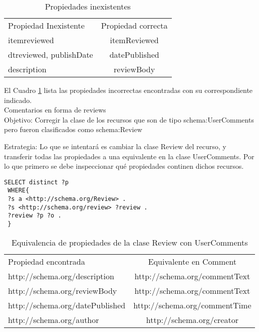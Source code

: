 \begin{table}[h]
\begin{tabular}{| l | c |}
 Propiedad Inexistente & Propiedad correcta \\
 itemreviewed & itemReviewed\\
 dtreviewed, publishDate & datePublished\\
 description & reviewBody
\end{tabular}
\caption{Propiedades inexistentes}
\label{table:UndefinedProps}
\end{table}

El Cuadro \ref{table:UndefinedProps} lista las propiedades incorrectas encontradas con su correspondiente indicado.
\\
Comentarios en forma de reviews\\
Objetivo:
Corregir la clase de los recursos que son de tipo schema:UserComments pero fueron clasificados como schema:Review

Estrategia: 
Lo que se intentará es cambiar la clase Review del recurso, y transferir todas las propiedades a una equivalente en la clase UserComments.
Por lo que primero se debe inspeccionar qué propiedades continen dichos recursos.

\begin{lstlisting}[frame=single]
 SELECT distinct ?p
 WHERE{
 ?s a <http://schema.org/Review> .
 ?s <http://schema.org/review> ?review .
 ?review ?p ?o .
 }
\end{lstlisting}

\begin{table}[h]
\begin{tabular}{| l | c |}
Propiedad encontrada & Equivalente en Comment\\
http://schema.org/description & http://schema.org/commentText \\
http://schema.org/reviewBody & http://schema.org/commentText \\
http://schema.org/datePublished & http://schema.org/commentTime \\
http://schema.org/author & http://schema.org/creator
\end{tabular}
\caption{Equivalencia de propiedades de la clase Review con UserComments}
\label{table:PropertyEqRevCom}
\end{table}

